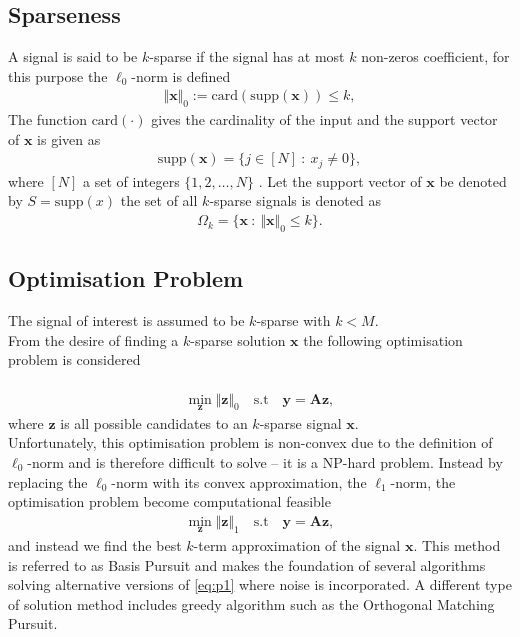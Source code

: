 \subsection{Sparseness} 
A signal is said to be $k$-sparse if the signal has at most $k$ non-zeros coefficient, for this purpose the $\ell_0$-norm is defined 
\begin{align*}
\Vert \mathbf{x} \Vert_0 := \text{card}(\text{supp}(\mathbf{x})) \leq k,
\end{align*}
The function $\text{card}(\cdot)$ gives the cardinality of the input and the support vector of $\mathbf{x}$ is given as
\begin{align*}
\text{supp}(\mathbf{x}) = \{ j \in [N] \ : \ x_j \neq 0 \},
\end{align*} 
where $[N]$ a set of integers $\{1,2,\hdots,N\}$ \cite[p. 41]{FR}. Let the support vector of $\textbf{x}$ be denoted by $S =\text{supp}(x)$ the set of all $k$-sparse signals is denoted as
\begin{align*}
\Omega_k = \{ \mathbf{x} \ : \ \Vert \mathbf{x} \Vert_0 \leq k \}.
\end{align*}

\subsection{Optimisation Problem} 
The signal of interest is assumed to be $k$-sparse with $k<M$. \\
From the desire of finding a $k$-sparse solution $\mathbf{x}$ the following optimisation problem is considered
\\ \\
\begin{align*}
\min_{\mathbf{z}} \Vert \mathbf{z} \Vert_0 \quad \text{s.t} \quad \mathbf{y} = \mathbf{Az},
\end{align*}
where $\mathbf{z}$ is all possible candidates to an $k$-sparse signal $\mathbf{x}$.
\\
Unfortunately, this optimisation problem is non-convex due to the definition of $\ell_0$-norm and is therefore difficult to solve -- it is a NP-hard problem. Instead by replacing the $\ell_0$-norm with its convex approximation, the $\ell_1$-norm, the optimisation problem become computational feasible \cite[p. 27]{CS}
\begin{align}\label{eq:p1}
\min_{\mathbf{z}} \Vert \mathbf{z} \Vert_1 \quad \text{s.t} \quad \mathbf{y} = \mathbf{Az},
\end{align} 
and instead we find the best $k$-term approximation of the signal $\mathbf{x}$.
This method is referred to as Basis Pursuit and makes the foundation of several algorithms solving alternative versions of \eqref{eq:p1} where noise is incorporated. A different type of solution method includes greedy algorithm such as the Orthogonal Matching Pursuit.    
      
